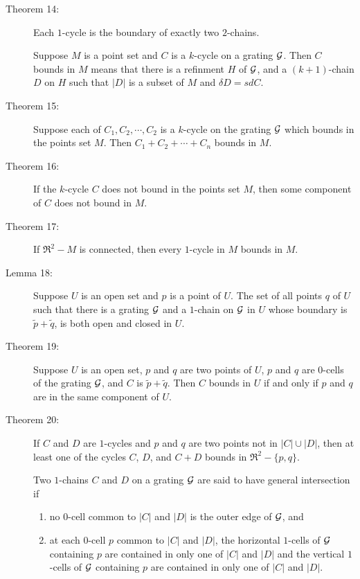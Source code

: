 \documentclass{article}
\begin{document}
\begin{description}
  \item[Theorem 14:] Each $1$-cycle is the boundary of exactly two $2$-chains.

  \item[] Suppose $M$ is a point set and $C$ is a $k$-cycle on a grating ${\cal G}$. Then $C$ bounds in $M$ means that there is a refinment $H$ of ${\cal G}$, and a $(k+1)$-chain $D$ on $H$ such that $|D|$ is a subset of $M$ and $\delta D = sdC$.

  \item[Theorem 15:] Suppose each of $C_1, C_2, \cdots, C_2$ is a $k$-cycle on the grating ${\cal G}$ which bounds in the points set $M$. Then $C_1 + C_2 + \cdots + C_n$ bounds in $M$.

  \item[Theorem 16:] If the $k$-cycle $C$ does not bound in the points set $M$, then some component of $C$ does not bound in $M$.

  \item[Theorem 17:] If $\Re^2-M$ is connected, then every $1$-cycle in $M$ bounds in $M$.

  \item[Lemma 18:] Suppose $U$ is an open set and $p$ is a point of $U$. The set of all points $q$ of $U$ such that there is a grating ${\cal G}$ and a $1$-chain on ${\cal G}$ in $U$ whose boundary is $\tilde{p} + \tilde{q}$, is both open and closed in $U$.

  \item[Theorem 19:] Suppose $U$ is an open set, $p$ and $q$ are two points of $U$, $p$ and $q$ are $0$-cells of the grating ${\cal G}$, and $C$ is $\tilde{p} + \tilde{q}$. Then $C$ bounds in $U$ if and only if $p$ and $q$ are in the same component of $U$.

  \item[Theorem 20:] If $C$ and $D$ are $1$-cycles and $p$ and $q$ are two points not in $|C| \cup |D|$, then at least one of the cycles $C$, $D$, and $C+D$ bounds in $\Re^2 - \{ p,q \}$.

  \item[] Two $1$-chains $C$ and $D$ on a grating ${\cal G}$ are said to have general intersection if
    \begin{enumerate}[\hspace{1cm}(1)]
      \item no $0$-cell common to $|C|$ and $|D|$ is the outer edge of ${\cal G}$, and
      \item at each $0$-cell $p$ common to $|C|$ and $|D|$, the horizontal $1$-cells of ${\cal G}$ containing $p$ are contained in only one of $|C|$ and $|D|$ and the vertical $1$-cells of ${\cal G}$ containing $p$ are contained in only one of $|C|$ and $|D|$.
    \end{enumerate}


\end{description}
\end{document}
